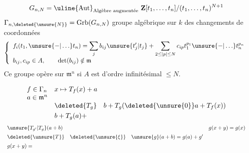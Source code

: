 \[
G_{n,N}=\uline{\mathrm{Aut}}_{\text{Algèbre augmentée}}\ \mathbf Z[t_1,\ldots,t_n]/(t_1,\ldots,t_n)^{N+1}
\]
$\Gamma_{n,\deleted{\unsure{N}}}=\mathrm{Grb}(G_{n,N})$ groupe algébrique sur $k$ des changements de coordonnées
\[
\left\{\begin{array}{l}
f_i(t_1,\unsure{-|\ldots}t_n)=\displaystyle\sum_jb_{ij}\unsure{t'_j|t_j}+\displaystyle\sum_{2\leq|p|\leq N}c_{ip}t_1^{p_1}\unsure{-|\ldots}t_n^{p_n}\\
b_{ij},c_{ip}\in A,\qquad\det(b_{ij})\notin\mathfrak m
\end{array}\right.
\]
Ce groupe opère sur $\mathfrak m^n$ si $A$ est d'ordre infinitésimal $\leq N$. 

\[
\begin{array}{ll}
f\in\Gamma_n & x\mapsto T_f(x)+a\\
a\in\mathfrak m^n & \\
&\deleted{T_g}\quad b+T_g(\deleted{\unsure{0}}a+T_f(x))\\[3pt]
&b+T_g(a)+
\end{array}
\]
\[
\begin{array}{ll}
\unsure{T_{g'}|T_g}(a+b)&g(x+y)=g(x)\\[5pt]
\deleted{\unsure{T}}\quad\deleted{\unsure{\xi}}\quad\unsure{g}(a+b)=g(a)+g'&\\[5pt]
g(x+y)=&
\end{array}
\]
